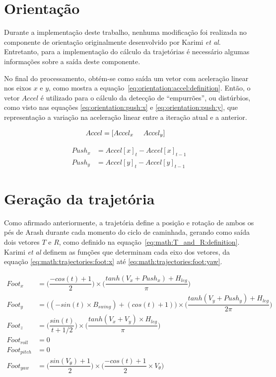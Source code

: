 \section{Orientação}
\label{sec:math:orientation}

Durante a implementação deste trabalho, nenhuma modificação foi realizada no componente de orientação originalmente desenvolvido por Karimi \textit{et al}. Entretanto, para a implementação do cálculo da trajetórias é necessário algumas informações sobre a saída deste componente.

No final do processamento, obtém-se como saída um vetor com aceleração linear nos eixos $x$ e $y$, como mostra a equação~\ref{eq:orientation:accel:definition}. Então, o vetor $Accel$ é utilizado para o cálculo da detecção de ``empurrões'', ou distúrbios, como visto nas equações \ref{eq:orientation:push:x} e \ref{eq:orientation:push:y}, que representação a variação na aceleração linear entre a iteração atual e a anterior.

\begin{align}
	Accel &= [Accel_x \hspace{5mm} Accel_y] \label{eq:orientation:accel:definition}
\end{align}

\begin{align}
	Push_x &= Accel[x]_t - Accel[x]_{t-1} 	 \label{eq:orientation:push:x}   \\
	Push_y &= Accel[y]_t - Accel[y]_{t-1}     \label{eq:orientation:push:y}
\end{align}

\section{Geração da trajetória}
\label{sec:math:trajectories}

Como afirmado anteriormente, a trajetória define a posição e rotação de ambos os pés de Arash durante cada momento do ciclo de caminhada, gerando como saída dois vetores $T$ e $R$, como definido na equação~\ref{eq:math:T_and_R:definition}. Karimi \textit{et al} definem as funções que determinam cada eixo dos vetores, da equação \ref{eq:math:trajectories:foot:x} até \ref{eq:math:trajectories:foot:yaw}.

\begin{align}
      Foot_x &= \bigg(\dfrac{-cos(t) + 1}{2}\bigg) \times \bigg(\dfrac{tanh(V_x + Push_x) + H_{leg}}{\pi}\bigg)                    \label{eq:math:trajectories:foot:x}  \\
      Foot_y &= \big((-sin(t) \times B_{swing}) + (cos(t) + 1)\big) \times \bigg(\dfrac{tanh(V_y + Push_y) + H_{leg}}{2\pi}\bigg) \\
      Foot_z &= \bigg(\dfrac{sin(t)}{t + 1/2}\bigg) \times \bigg(\dfrac{tanh(V_x + V_y) \times H_{leg}}{\pi}\bigg) \\
 Foot_{roll} &= 0 \\
Foot_{pitch} &= 0 \\
  Foot_{yaw} &= \bigg(\dfrac{sin(V_\theta) + 1}{2}\bigg) \times \bigg(\dfrac{-cos(t) + 1}{2} \times V_\theta\bigg)     \label{eq:math:trajectories:foot:yaw}
\end{align}


